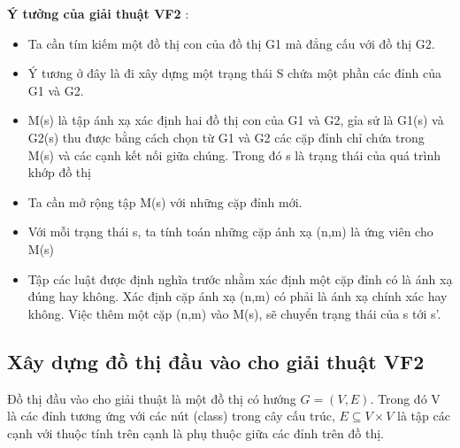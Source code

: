 \documentclass[12pt]{report}
\begin{document}
\noindent \textbf{Ý tưởng của giải thuật VF2} \cite{vf2}:
\begin{itemize}
	\item Ta cần tím kiếm một đồ thị con của đồ thị G1 mà đẳng cấu với đồ thị G2.
	\item  Ý tương ở đây là đi xây dựng một trạng thái S chứa một phần các đỉnh của G1 và G2.
	
	\item M(s) là tập ánh xạ xác định hai đồ thị con của G1 và G2, gỉa sử là G1(s) và G2(s) thu được bằng cách chọn từ G1 và G2 các cặp đỉnh chỉ chứa trong M(s) và các cạnh kết nối giữa chúng. Trong đó s là trạng thái của quá trình khớp đồ thị
	\item Ta cần mở rộng tập M(s) với những cặp đỉnh mới.
	\item Với mỗi trạng thái s, ta tính toán những cặp ánh xạ (n,m) là ứng viên cho  M(s)
	\item Tập các luật được định nghĩa trước nhằm xác định một cặp đỉnh có là ánh xạ đúng hay không. Xác định cặp ánh xạ (n,m) có phải là ánh xạ chính xác hay không. Việc thêm một cặp (n,m) vào M(s), sẽ chuyển trạng thái của s tới s'.
\end{itemize}
\pagebreak
\subsection{Xây dựng đồ thị đầu vào cho giải thuật VF2}
Đồ thị đầu vào cho giải thuật là một đồ thị có hướng $G = (V,E)$. Trong đó V là các đỉnh tương ứng với các nút (class) trong cây cấu trúc, $E \subseteq V \times V$ là tập các cạnh với thuộc tính trên cạnh là phụ thuộc giữa các đỉnh trên đồ thị.
\end{document}
